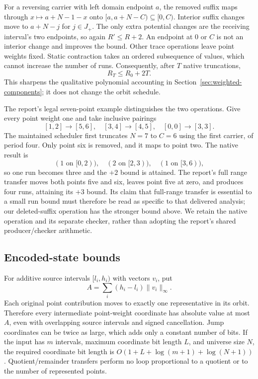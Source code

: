 For a reversing carrier with left domain endpoint $a$, the removed suffix
maps through $x\mapsto a+N-1-x$ onto $[a,a+N-C)\subseteq[0,C)$.
Interior suffix changes move to $a+N-j$ for $j\in J_+$. The only extra
potential changes are the receiving interval's two endpoints, so again
$R'\le R+2$. An endpoint at $0$ or $C$ is not an interior change and
improves the bound. Other trace operations leave point weights fixed.
Static contraction takes an ordered subsequence of values, which cannot
increase the number of runs. Consequently, after $T$ native truncations,
\[
                  R_T\le R_0+2T.
\]
This sharpens the qualitative polynomial accounting in
Section~\ref{sec:weighted-components}; it does not change the orbit schedule.

The report's legal seven-point example distinguishes the two operations.
Give every point weight one and take inclusive pairings
\[
 [1,2]\longrightarrow[5,6],\quad
 [3,4]\longrightarrow[4,5],\quad
 [0,0]\longrightarrow[3,3].
\]
The maintained scheduler first truncates $N=7$ to $C=6$ using the first
carrier, of period four. Only point six is removed, and it maps to point
two. The native result is
\[
 (1\text{ on }[0,2)),\quad(2\text{ on }[2,3)),\quad
 (1\text{ on }[3,6)),
\]
so one run becomes three and the $+2$ bound is attained. The report's full
range transfer moves both points five and six, leaves point five at zero,
and produces four runs, attaining its $+3$ bound. Its claim that full-range
transfer is essential to a small run bound must therefore be read as
specific to that delivered analysis; our deleted-suffix operation has the
stronger bound above. We retain the native operation and its separate checker,
rather than adopting the report's shared producer/checker arithmetic.

\subsection{Encoded-state bounds}

For additive source intervals $[l_i,h_i)$ with vectors $v_i$, put
\[
 A=\sum_i(h_i-l_i)\lVert v_i\rVert_\infty.
\]
Each original point contribution moves to exactly one representative in its
orbit. Therefore every intermediate point-weight coordinate has absolute value at most
$A$, even with overlapping source intervals and signed cancellation. Jump
coordinates can be twice as large, which adds only a constant number of bits. If the
input has $m$ intervals, maximum coordinate bit length $L$, and universe
size $N$, the required coordinate bit length is
$O(1+L+\log(m+1)+\log(N+1))$. Quotient/remainder transfers perform no loop
proportional to a quotient or to the number of represented points.


